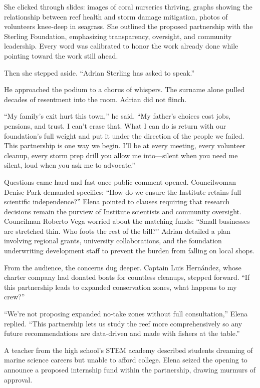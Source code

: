 She clicked through slides: images of coral nurseries thriving, graphs showing the relationship between reef health and storm damage mitigation, photos of volunteers knee-deep in seagrass. She outlined the proposed partnership with the Sterling Foundation, emphasizing transparency, oversight, and community leadership. Every word was calibrated to honor the work already done while pointing toward the work still ahead.

Then she stepped aside. “Adrian Sterling has asked to speak.”

He approached the podium to a chorus of whispers. The surname alone pulled decades of resentment into the room. Adrian did not flinch.

“My family’s exit hurt this town,” he said. “My father’s choices cost jobs, pensions, and trust. I can’t erase that. What I can do is return with our foundation’s full weight and put it under the direction of the people we failed. This partnership is one way we begin. I’ll be at every meeting, every volunteer cleanup, every storm prep drill you allow me into—silent when you need me silent, loud when you ask me to advocate.”

Questions came hard and fast once public comment opened. Councilwoman Denise Park demanded specifics: “How do we ensure the Institute retains full scientific independence?” Elena pointed to clauses requiring that research decisions remain the purview of Institute scientists and community oversight. Councilman Roberto Vega worried about the matching funds: “Small businesses are stretched thin. Who foots the rest of the bill?” Adrian detailed a plan involving regional grants, university collaborations, and the foundation underwriting development staff to prevent the burden from falling on local shops.

From the audience, the concerns dug deeper. Captain Luis Hernández, whose charter company had donated boats for countless cleanups, stepped forward. “If this partnership leads to expanded conservation zones, what happens to my crew?”

“We’re not proposing expanded no-take zones without full consultation,” Elena replied. “This partnership lets us study the reef more comprehensively so any future recommendations are data-driven and made with fishers at the table.”

A teacher from the high school’s STEM academy described students dreaming of marine science careers but unable to afford college. Elena seized the opening to announce a proposed internship fund within the partnership, drawing murmurs of approval.

